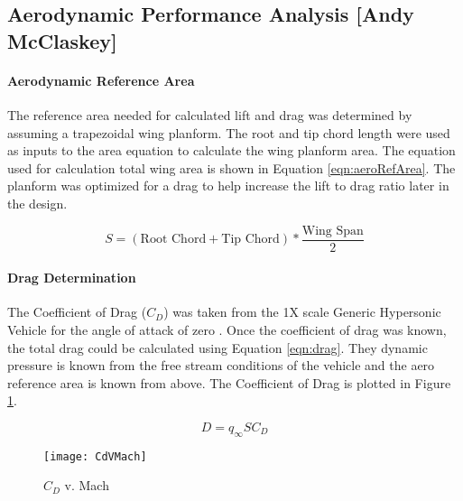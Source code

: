 \subsection{Aerodynamic Performance Analysis [Andy McClaskey]}
\paragraph{Aerodynamic Reference Area}
The reference area needed for calculated lift and drag was determined by assuming a trapezoidal wing planform. The root and tip chord length were used as inputs to the area equation to calculate the wing planform area. The equation used for calculation total wing area is shown in Equation \ref{eqn:aeroRefArea}. The planform was optimized for a drag to help increase the lift to drag ratio later in the design.

\begin{equation}
\label{eqn:aeroRefArea}
S = (\text{Root Chord} + \text{Tip Chord})*\frac{\text{Wing Span}}{2}
\end{equation}

\paragraph{Drag Determination}

The Coefficient of Drag ($C_D$) was taken from the 1X scale Generic Hypersonic Vehicle for the angle of attack of zero \cite{ghv}. Once the coefficient of drag was known, the total drag could be calculated using Equation \ref{eqn:drag}. They dynamic pressure is known from the free stream conditions of the vehicle and the aero reference area is known from above. The Coefficient of Drag is plotted in Figure \ref{fig:CdVMach}.

\begin{equation}
\label{eqn:drag}
D = q_{\infty}SC_D
\end{equation}



\begin{figure}[H]
\begin{center}
\texttt{[image: CdVMach]}
\caption{$C_D$ v. Mach}
\label{fig:CdVMach}
\end{center}
\end{figure}

\begin{comment}
The total drag for the vehicle is shown in Figure \ref{fig:dragVMach}.

\begin{figure}[H]
\begin{center}
\texttt{[image: dragVMach]}
\caption{Drag v. Mach}
\label{fig:dragVMach}
\end{center}
\end{figure}

\end{comment}

